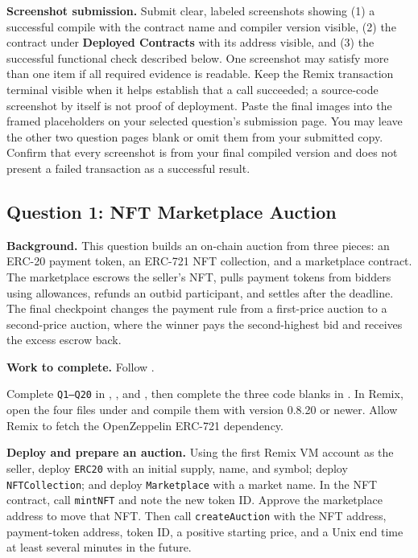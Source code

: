 \documentclass[11pt,letterpaper]{article}
\begin{document}
\textbf{Screenshot submission.} Submit clear, labeled screenshots showing
(1) a successful compile with the contract name and compiler version visible,
(2) the contract under \textbf{Deployed Contracts} with its address visible,
and (3) the successful functional check described below. One screenshot may
satisfy more than one item if all required evidence is readable. Keep the
Remix transaction terminal visible when it helps establish that a call
succeeded; a source-code screenshot by itself is not proof of deployment.
Paste the final images into the framed placeholders on your selected question's
submission page. You may leave the other two question pages blank or omit them
from your submitted copy. Confirm that every screenshot is from your final
compiled version and does not present a failed transaction as a successful
result.

\newpage
\subsection*{Question 1: NFT Marketplace Auction}

\textbf{Background.} This question builds an on-chain auction from three pieces:
an ERC-20 payment token, an ERC-721 NFT collection, and a marketplace contract.
The marketplace escrows the seller's NFT, pulls payment tokens from bidders
using allowances, refunds an outbid participant, and settles after the
deadline. The final checkpoint changes the payment rule from a first-price
auction to a second-price auction, where the winner pays the second-highest bid
and receives the excess escrow back.

\textbf{Work to complete.} Follow .

Complete \texttt{Q1--Q20} in , , and
, then complete the three code blanks in
. In Remix, open the four files under
 and compile them with version 0.8.20 or newer. Allow Remix to
fetch the OpenZeppelin ERC-721 dependency.

\textbf{Deploy and prepare an auction.} Using the first Remix VM account as
the seller, deploy \texttt{ERC20} with an initial supply, name, and symbol;
deploy \texttt{NFTCollection}; and deploy \texttt{Marketplace} with a market
name. In the NFT contract, call \texttt{mintNFT} and note the new token ID.
Approve the marketplace address to move that NFT. Then call
\texttt{createAuction} with the NFT address, payment-token address, token ID,
a positive starting price, and a Unix end time at least several minutes in the
future.
\end{document}
